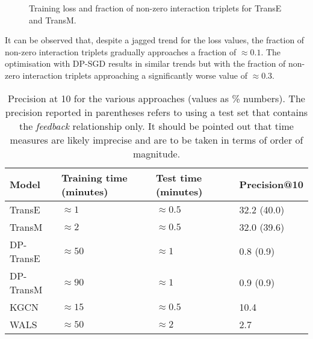 \begin{figure}[htbp]
  \centering
  \caption{Training loss and fraction of non-zero interaction triplets for TransE and TransM.}
\end{figure}

It can be observed that, despite a jagged trend for the loss values, the fraction of non-zero interaction triplets gradually approaches a fraction of $\approx 0.1$.
The optimisation with DP-SGD results in similar trends but with the fraction of non-zero interaction triplets approaching a significantly worse value of $\approx 0.3$.

\begin{table}[htbp]
  \centering
\begin{tabular}{llll}
\hline
Model&Training time (minutes)&Test time (minutes)&Precision@10\\
\hline
TransE&$\approx{1}$&$\approx{0.5}$&32.2 (40.0)\\
TransM&$\approx{2}$&$\approx{0.5}$&32.0 (39.6)\\
DP-TransE&$\approx{50}$&$\approx{1}$&0.8 (0.9)\\
DP-TransM&$\approx{90}$&$\approx{1}$&0.9 (0.9)\\
KGCN&$\approx 15$&$\approx 0.5$&10.4\\
WALS&$\approx{50}$&$\approx{2}$&2.7\\
\end{tabular}
\caption{Precision at 10 for the various approaches (values as \% numbers). The precision reported in parentheses refers to using a test set that contains the \emph{feedback} relationship only. It should be pointed out that time measures are likely imprecise and are to be taken in terms of order of magnitude.}
\label{tab:comparison}
\end{table}

